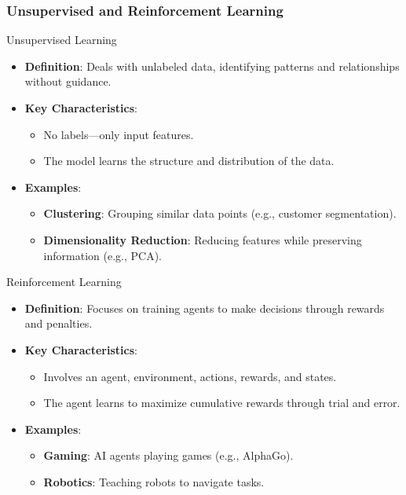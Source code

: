 \documentclass[aspectratio=169]{beamer}
\begin{document}
\begin{frame}[fragile]
    \frametitle{Unsupervised and Reinforcement Learning}
    \begin{block}{Unsupervised Learning}
        \begin{itemize}
            \item \textbf{Definition}: Deals with unlabeled data, identifying patterns and relationships without guidance.
            \item \textbf{Key Characteristics}:
            \begin{itemize}
                \item No labels—only input features.
                \item The model learns the structure and distribution of the data.
            \end{itemize}
            \item \textbf{Examples}:
            \begin{itemize}
                \item \textbf{Clustering}: Grouping similar data points (e.g., customer segmentation).
                \item \textbf{Dimensionality Reduction}: Reducing features while preserving information (e.g., PCA).
            \end{itemize}
        \end{itemize}
    \end{block}
    
    \begin{block}{Reinforcement Learning}
        \begin{itemize}
            \item \textbf{Definition}: Focuses on training agents to make decisions through rewards and penalties.
            \item \textbf{Key Characteristics}:
            \begin{itemize}
                \item Involves an agent, environment, actions, rewards, and states.
                \item The agent learns to maximize cumulative rewards through trial and error.
            \end{itemize}
            \item \textbf{Examples}:
            \begin{itemize}
                \item \textbf{Gaming}: AI agents playing games (e.g., AlphaGo).
                \item \textbf{Robotics}: Teaching robots to navigate tasks.
            \end{itemize}
        \end{itemize}
    \end{block}
\end{frame}
\end{document}
